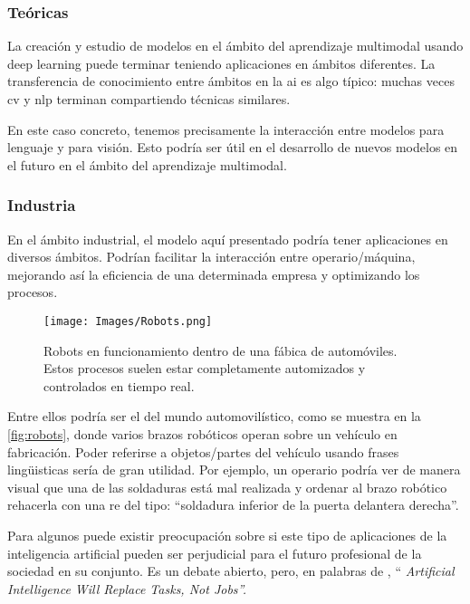 \subsubsection{Teóricas}
La creación y estudio de modelos en el ámbito del aprendizaje multimodal usando
deep learning puede terminar teniendo aplicaciones en ámbitos diferentes. La
transferencia de conocimiento entre ámbitos en la \gls{ai} es algo típico:
muchas veces \gls{cv} y \gls{nlp} terminan compartiendo técnicas similares.

En este caso concreto, tenemos precisamente la interacción entre modelos para
lenguaje y para visión. Esto podría ser útil en el desarrollo de nuevos modelos
en el futuro en el ámbito del aprendizaje multimodal.

\subsubsection{Industria}
En el ámbito industrial, el modelo aquí presentado podría tener aplicaciones en
diversos ámbitos. Podrían facilitar la interacción entre operario/máquina,
mejorando así la eficiencia de una determinada empresa y optimizando los
procesos.

\begin{figure}[ht]
  \centering
  \texttt{[image: Images/Robots.png]}
  \caption[Robots en fábrica de automóviles]{Robots en funcionamiento dentro de
    una fábica de automóviles. Estos procesos suelen estar completamente
    automizados y controlados en tiempo real.}
  \label{fig:robots}
\end{figure}

Entre ellos podría ser el del mundo automovilístico, como se
muestra en la \vref{fig:robots}, donde varios brazos robóticos operan sobre un
vehículo en fabricación. Poder referirse a objetos/partes del vehículo usando
frases lingüisticas sería de gran utilidad. Por ejemplo, un operario podría ver
de manera visual que una de las soldaduras está mal realizada y ordenar al
brazo robótico rehacerla con una \gls{re} del tipo: ``soldadura inferior de la
puerta delantera derecha''.

\begin{remarkBox}
  Para algunos puede existir preocupación sobre si este tipo de aplicaciones de
  la inteligencia artificial pueden ser perjudicial para el futuro profesional
  de la sociedad en su conjunto. Es un debate abierto, pero, en palabras de
  \citeauthor*{contributor18:artif_intel_will_replac_tasks_not_jobs}
  \cite{contributor18:artif_intel_will_replac_tasks_not_jobs}, ``\itshape
  Artificial Intelligence Will Replace Tasks, Not Jobs''.
\end{remarkBox}

